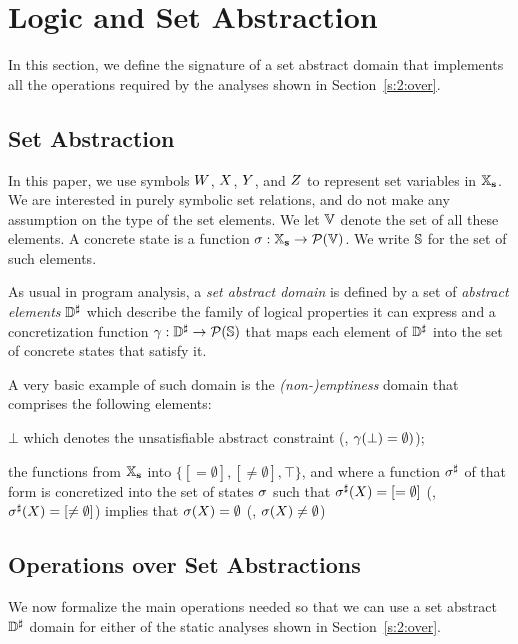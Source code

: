 \section{Logic and Set Abstraction}
\label{sec:logic-and-set-abstraction}
In this section, we define the signature of a set abstract domain that
implements all the operations required by the analyses shown in
Section~\ref{s:2:over}.

\subsection{Set Abstraction}
\label{s:3:1:abs}
In this paper, we use symbols $W$, $X$, $Y$, and $Z$
to represent set variables in $\mathbb{X}_{\bf s}$.
We are interested in purely symbolic set relations, and do not make any
assumption on the type of the set elements.
We let \( \mathbb{V} \) denote the set of all these elements.
A concrete state is a function \( \sigma: \mathbb{X}_{\bf s} \rightarrow
\mathcal{P}(\mathbb{V}) \).
We write \( \mathbb{S} \) for the set of such elements.

As usual in program analysis, a {\em set abstract domain} is defined by a
set of {\em abstract elements} \( {\mathbb{D}}^{\sharp} \) which describe the family of
logical properties it can express and a concretization function
\( \gamma: {\mathbb{D}}^{\sharp} \rightarrow \mathcal{P}(\mathbb{S}) \) that maps each
element of \( {\mathbb{D}}^{\sharp} \) into the set of concrete states that satisfy it.
\begin{example}
  \label{ex:1:mt}
  A very basic example of such domain is the {\em (non-)emptiness} domain
  that comprises the following elements:
  \begin{compactitem}
  \item \( \bot \) which denotes the unsatisfiable abstract constraint
    (\ie, \( \gamma( \bot ) = \emptyset ) \));
  \item the functions from \( \mathbb{X}_{\bf s} \) into \( \{ [=\emptyset],
    [\not=\emptyset], \top \} \), and where a function \( {\sigma}^{\sharp} \) of
    that form is concretized into the set of states \( \sigma \) such that
    \( {\sigma}^{\sharp}( X ) = [=\emptyset] \) (\resp, \( {\sigma}^{\sharp}( X ) =
    [\not=\emptyset] \)) implies that \( \sigma( X ) = \emptyset \)
    (\resp, \( \sigma( X ) \not= \emptyset \))
  \end{compactitem}
\end{example}

\subsection{Operations over Set Abstractions}
\label{s:3:2:sign}
We now formalize the main operations needed so that we can use
a set abstract \( {\mathbb{D}}^{\sharp} \) domain for either of the static analyses shown
in Section~\ref{s:2:over}.

